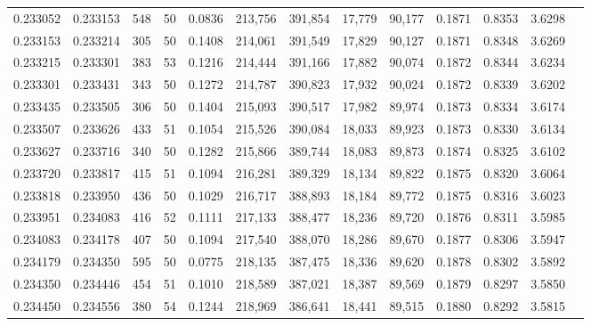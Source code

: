 \begin{tabular}{rrrrrrrrrrrrr}
0.233052 & 0.233153 &   548 &  50 &                                     0.0836 & 213,756 & 391,854 &  17,779 &  90,177 & 0.1871 & 0.8353 & 3.6298 \\
0.233153 & 0.233214 &   305 &  50 &                                     0.1408 & 214,061 & 391,549 &  17,829 &  90,127 & 0.1871 & 0.8348 & 3.6269 \\
0.233215 & 0.233301 &   383 &  53 &                                     0.1216 & 214,444 & 391,166 &  17,882 &  90,074 & 0.1872 & 0.8344 & 3.6234 \\
0.233301 & 0.233431 &   343 &  50 &                                     0.1272 & 214,787 & 390,823 &  17,932 &  90,024 & 0.1872 & 0.8339 & 3.6202 \\
0.233435 & 0.233505 &   306 &  50 &                                     0.1404 & 215,093 & 390,517 &  17,982 &  89,974 & 0.1873 & 0.8334 & 3.6174 \\
0.233507 & 0.233626 &   433 &  51 &                                     0.1054 & 215,526 & 390,084 &  18,033 &  89,923 & 0.1873 & 0.8330 & 3.6134 \\
0.233627 & 0.233716 &   340 &  50 &                                     0.1282 & 215,866 & 389,744 &  18,083 &  89,873 & 0.1874 & 0.8325 & 3.6102 \\
0.233720 & 0.233817 &   415 &  51 &                                     0.1094 & 216,281 & 389,329 &  18,134 &  89,822 & 0.1875 & 0.8320 & 3.6064 \\
0.233818 & 0.233950 &   436 &  50 &                                     0.1029 & 216,717 & 388,893 &  18,184 &  89,772 & 0.1875 & 0.8316 & 3.6023 \\
0.233951 & 0.234083 &   416 &  52 &                                     0.1111 & 217,133 & 388,477 &  18,236 &  89,720 & 0.1876 & 0.8311 & 3.5985 \\
0.234083 & 0.234178 &   407 &  50 &                                     0.1094 & 217,540 & 388,070 &  18,286 &  89,670 & 0.1877 & 0.8306 & 3.5947 \\
0.234179 & 0.234350 &   595 &  50 &                                     0.0775 & 218,135 & 387,475 &  18,336 &  89,620 & 0.1878 & 0.8302 & 3.5892 \\
0.234350 & 0.234446 &   454 &  51 &                                     0.1010 & 218,589 & 387,021 &  18,387 &  89,569 & 0.1879 & 0.8297 & 3.5850 \\
0.234450 & 0.234556 &   380 &  54 &                                     0.1244 & 218,969 & 386,641 &  18,441 &  89,515 & 0.1880 & 0.8292 & 3.5815 \\

\end{tabular}
